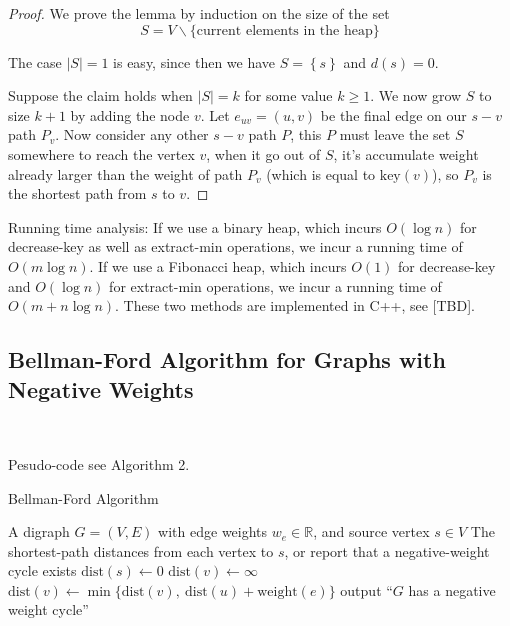\documentclass[11pt]{article}
\theoremstyle{plain}
\begin{document}
  \begin{proof}
    We prove the lemma by induction on the size of the set 
    \[
      S = V \backslash \{\text{current elements in the heap}\}
    \]

    The case $|S|=1$ is easy, since then we have $S = \left\{ s \right\} $ and $d(s) = 0$.

    Suppose the claim holds when $|S| = k$ for some value $k \geq 1$. We now grow $S$ to size $k+1$ by adding the node $v$.
    Let $e_{uv}=(u, v)$ be the final edge on our $s-v$ path $P_v$. Now consider any other $s-v$ path $P$, 
    this $P$ must leave the set $S$ somewhere to reach the vertex $v$, when it go out of $S$, it's accumulate 
    weight already larger than the weight of path $P_v$ (which is equal to $\text{key}(v)$), so $P_v$ is the shortest path from $s$ to $v$.
  \end{proof}

  Running time analysis: If we use a binary heap, which incurs $O(\log n)$ for decrease-key as well as extract-min 
  operations, we incur a running time of $O(m \log n)$. If we use a Fibonacci heap, which incurs $O(1)$ for decrease-key
  and $O(\log n)$ for extract-min operations, we incur a running time of $O(m + n \log n)$. These two methods are implemented in C++, see [TBD].

\subsection{Bellman-Ford Algorithm for Graphs with Negative Weights}\

Pesudo-code see Algorithm 2.

\begin{algorithm}
  \caption{Bellman-Ford Algorithm}
  \begin{algorithmic}[1]
  \REQUIRE A digraph $G = (V, E)$ with edge weights $w_e \in \mathbb{R}$, and source vertex $s \in V$
  \ENSURE The shortest-path distances from each vertex to $s$, or report that a negative-weight cycle exists
  \STATE $\text{dist}(s) \leftarrow 0$ 
      \STATE $\text{dist}(v) \leftarrow \infty$
  \ENDFOR
          \STATE $\text{dist}(v) \leftarrow \min\{\text{dist}(v),\ \text{dist}(u) + \text{weight}(e)\}$
      \ENDFOR
  \ENDFOR
      \STATE output ``$G$ has a negative weight cycle''
  \ENDIF
  \end{algorithmic}
\end{algorithm}
\end{document}
